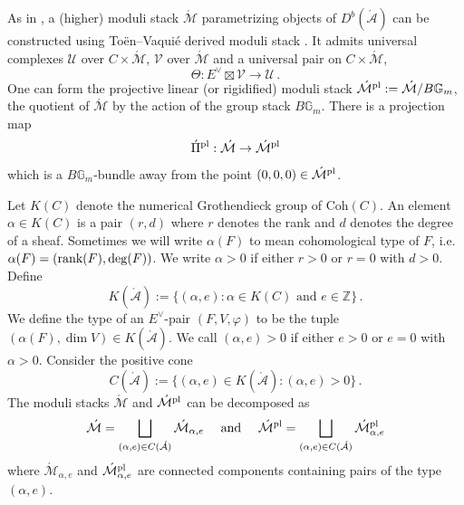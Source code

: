 \documentclass[11pt]{amsart}
\theoremstyle{remark}
\newcommand{\Z}{\mathbb{Z}}
\newcommand{\Adash}{\acute{\mathcal{A}}}
\newcommand{\mb}[1]{\mathbb{#1}}
\newcommand{\Mdash}{\acute{\mathcal{M}}}
\newcommand{\Pidash}{\acute{\Pi}}
\newcommand{\U}{\mathcal{U}}
\newcommand{\V}{\mathcal{V}}
\newcommand{\rk}{\textnormal{rank}}
\newcommand{\vp}[0]{\varphi}
\newcommand{\pl}[0]{\textnormal{pl}}
\numberwithin{theorem}{section}
\begin{document}
    As in \cite[Definition 8.4]{Joy21},
    a (higher) moduli stack $\Mdash$ parametrizing objects of $D^b(\Adash)$ can be constructed using Toën–Vaquié derived moduli stack \cite{TV07}.
    It admits universal complexes 
    $\U$ over $C \times \Mdash$, $\V$ over $\Mdash$ and a universal pair on $C \times \Mdash$,
    $$ \Theta : E^\vee \boxtimes \V \to \U \,.$$
    One can form the projective linear (or rigidified) moduli stack 
    $\Mdash^\pl: = \Mdash/B\mb G_m$, 
    the quotient of $\Mdash$ by the action of the group stack $B\mb G_m$.
    There is a projection map 
    $$\Pidash^\pl : \Mdash \to \Mdash^\pl$$
    which is a $B\mb G_m$-bundle away from the point $(0,0,0) \in \Mdash^\pl$.

    Let $K(C)$ denote the numerical Grothendieck group of $\text{Coh}(C)$.
    An element $\alpha \in K(C)$ is a pair $(r,d)$ where $r$ denotes the rank and $d$ denotes the degree of a sheaf.
    Sometimes we will write $\alpha(F)$ to mean cohomological type of $F$, i.e. $\alpha(F) = (\rk(F),\deg(F))$.
    We write $\alpha>0$ if either $r>0$ or $r=0$ with $d>0$.
    Define $$K(\Adash) := \{(\alpha,e): \alpha \in K(C) \text{ and } e \in \Z\} \,.$$
    We define the type of an $E^\vee$-pair $(F,V,\vp)$ to be the tuple $(\alpha(F),\dim V) \in K(\Adash)$.
    We call $(\alpha,e)>0$ if either $e>0$ or $e=0$ with $\alpha>0$.
    Consider the positive cone 
    $$ C(\Adash) := \{ (\alpha,e) \in K(\Adash) : (\alpha,e)>0  \}\,.$$
    The moduli stacks $\Mdash$ and $\Mdash^\pl$ can be decomposed as
    $$\Mdash = \bigsqcup_{(\alpha,e) \in C(\Adash)} \Mdash_{\alpha,e} \quad \text{ and } \quad \Mdash^\pl = \bigsqcup_{(\alpha,e) \in C(\Adash)} \Mdash_{\alpha,e}^\pl$$
    where $\Mdash_{\alpha,e}$ and $\Mdash_{\alpha,e}^\pl$ are connected components containing pairs of the type $(\alpha,e)$.
    
\end{document}
